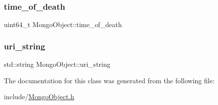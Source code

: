 \mbox{\label{class_mongo_object_a0ced4ff82fbee4e7213715994d690380}} 
\subsubsection{\texorpdfstring{time\+\_\+of\+\_\+death}{time\_of\_death}}
{\footnotesize\ttfamily uint64\+\_\+t Mongo\+Object\+::time\+\_\+of\+\_\+death\hspace{0.3cm}{\ttfamily [protected]}}

\mbox{\label{class_mongo_object_a71e3fa5196ad3b496d0aa326d61e84e8}} 
\subsubsection{\texorpdfstring{uri\+\_\+string}{uri\_string}}
{\footnotesize\ttfamily std\+::string Mongo\+Object\+::uri\+\_\+string\hspace{0.3cm}{\ttfamily [protected]}}



The documentation for this class was generated from the following file\+:\begin{DoxyCompactItemize}
\item 
include/\hyperlink{_mongo_object_8h}{Mongo\+Object.\+h}\end{DoxyCompactItemize}
